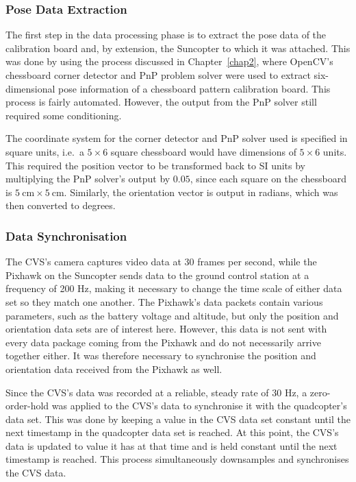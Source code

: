 \subsubsection{Pose Data Extraction}

The first step in the data processing phase is to extract the pose data of the calibration board and, by extension, the Suncopter to which it was attached. This was done by using the process discussed in Chapter~\ref{chap2}, where OpenCV's chessboard corner detector and PnP problem solver were used to extract six-dimensional pose information of a chessboard pattern calibration board. This process is fairly automated. However, the output from the PnP solver still required some conditioning.

The coordinate system for the corner detector and PnP solver used is specified in square units, i.e.\ a $5\times6$ square chessboard would have dimensions of $5\times6$ units. This required the position vector to be transformed back to SI units by multiplying the PnP solver's output by $0.05$, since each square on the chessboard is $\SI{5}{\cm}\times\SI{5}{\cm}$. Similarly, the orientation vector is output in radians, which was then converted to degrees. 

\subsubsection{Data Synchronisation}

The CVS's camera captures video data at 30 frames per second, while the Pixhawk on the Suncopter sends data to the ground control station at a frequency of 200 Hz, making it necessary to change the time scale of either data set so they match one another. The Pixhawk's data packets contain various parameters, such as the battery voltage and altitude, but only the position and orientation data sets are of interest here. However, this data is not sent with every data package coming from the Pixhawk and do not necessarily arrive together either. It was therefore necessary to synchronise the position and orientation data received from the Pixhawk as well.

Since the CVS's data was recorded at a reliable, steady rate of 30 Hz, a zero-order-hold was applied to the CVS's data to synchronise it with the quadcopter's data set. This was done by keeping a value in the CVS data set constant until the next timestamp in the quadcopter data set is reached. At this point, the CVS's data is updated to value it has at that time and is held constant until the next timestamp is reached. This process simultaneously downsamples and synchronises the CVS data.  

